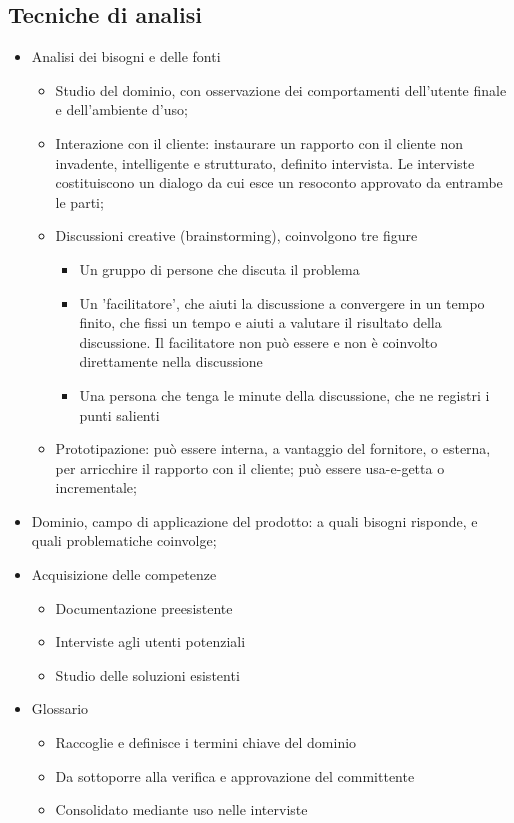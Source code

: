 \subsection{Tecniche di analisi}
\begin{itemize}
	\item Analisi dei bisogni e delle fonti
		\begin{itemize}
			\item Studio del dominio, con osservazione dei comportamenti dell'utente finale e dell'ambiente d'uso;
			\item Interazione con il cliente: instaurare un rapporto con il cliente non invadente, intelligente e strutturato, definito intervista. Le interviste costituiscono un dialogo da cui esce un resoconto approvato da entrambe le parti;
			\item Discussioni creative (brainstorming), coinvolgono tre figure
				\begin{itemize}
					\item Un gruppo di persone che discuta il problema
					\item Un 'facilitatore', che aiuti la discussione a convergere in un tempo finito, che fissi un tempo e aiuti a valutare il risultato della discussione. Il facilitatore non può essere  e non è coinvolto direttamente nella discussione
					\item Una persona che tenga le minute della discussione, che ne registri i punti salienti
				\end{itemize}
			\item Prototipazione: può essere interna, a vantaggio del fornitore, o esterna, per arricchire il rapporto con il cliente; può essere usa-e-getta o incrementale;
		\end{itemize}
	\item Dominio, campo di applicazione del prodotto: a quali bisogni risponde, e quali problematiche coinvolge;
	\item Acquisizione delle competenze
		\begin{itemize}
			\item Documentazione preesistente
			\item Interviste agli utenti potenziali
			\item Studio delle soluzioni esistenti
		\end{itemize}
	\item Glossario
		\begin{itemize}
			\item Raccoglie e definisce i termini chiave del dominio
			\item Da sottoporre alla verifica e approvazione del committente
			\item Consolidato mediante uso nelle interviste
		\end{itemize}
\end{itemize}

